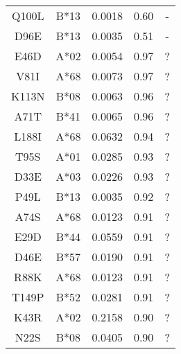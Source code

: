 \documentclass{article}
\begin{document}
\begin{table}[h!]
\begin{tabular}{c|c|c|c|c}
  Q100L       & B*13 & 0.0018                        & 0.60                                & -                        \\
  D96E        & B*13 & 0.0035                        & 0.51                                & -  \\\hline
  E46D & A*02 & 0.0054 & 0.97 & ? \\
  V81I & A*68 & 0.0073 & 0.97 & ? \\
  K113N & B*08 & 0.0063 & 0.96 & ? \\
  A71T & B*41 & 0.0065 & 0.96 & ? \\
  L188I & A*68 & 0.0632 & 0.94 & ? \\
  T95S & A*01 & 0.0285 & 0.93 & ? \\
  D33E & A*03 & 0.0226 & 0.93 & ? \\
  P49L & B*13 & 0.0035 & 0.92 & ? \\
  A74S & A*68 & 0.0123 & 0.91 & ? \\
  E29D & B*44 & 0.0559 & 0.91 & ? \\
  D46E & B*57 & 0.0190 & 0.91 & ? \\
  R88K & A*68 & 0.0123 & 0.91 & ? \\
  T149P & B*52 & 0.0281 & 0.91 & ? \\
  K43R & A*02 & 0.2158 & 0.90 & ? \\
  N22S & B*08 & 0.0405 & 0.90 & ? \\
  \end{tabular}
  \label{tab:false-positives}
 \end{table}

 


\end{document}
